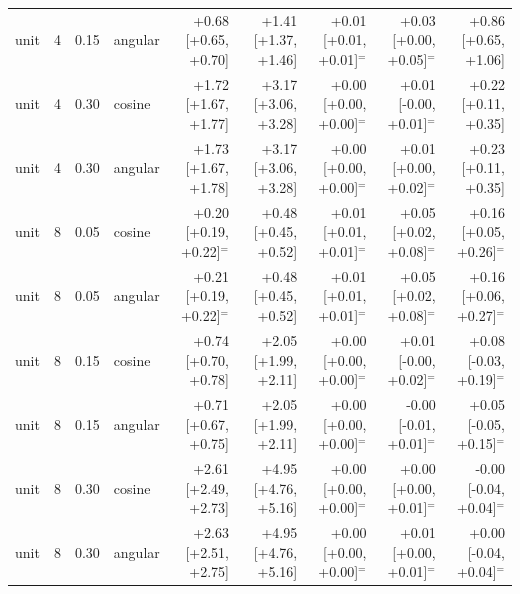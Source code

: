 \begin{tabular}{lrrlrrrrr}
unit & 4 & 0.15 & angular & +0.68 [+0.65, +0.70] & +1.41 [+1.37, +1.46] & +0.01 [+0.01, +0.01]$^{=}$ & +0.03 [+0.00, +0.05]$^{=}$ & +0.86 [+0.65, +1.06] \\
unit & 4 & 0.30 & cosine & +1.72 [+1.67, +1.77] & +3.17 [+3.06, +3.28] & +0.00 [+0.00, +0.00]$^{=}$ & +0.01 [-0.00, +0.01]$^{=}$ & +0.22 [+0.11, +0.35] \\
unit & 4 & 0.30 & angular & +1.73 [+1.67, +1.78] & +3.17 [+3.06, +3.28] & +0.00 [+0.00, +0.00]$^{=}$ & +0.01 [+0.00, +0.02]$^{=}$ & +0.23 [+0.11, +0.35] \\
unit & 8 & 0.05 & cosine & +0.20 [+0.19, +0.22]$^{=}$ & +0.48 [+0.45, +0.52] & +0.01 [+0.01, +0.01]$^{=}$ & +0.05 [+0.02, +0.08]$^{=}$ & +0.16 [+0.05, +0.26]$^{=}$ \\
unit & 8 & 0.05 & angular & +0.21 [+0.19, +0.22]$^{=}$ & +0.48 [+0.45, +0.52] & +0.01 [+0.01, +0.01]$^{=}$ & +0.05 [+0.02, +0.08]$^{=}$ & +0.16 [+0.06, +0.27]$^{=}$ \\
unit & 8 & 0.15 & cosine & +0.74 [+0.70, +0.78] & +2.05 [+1.99, +2.11] & +0.00 [+0.00, +0.00]$^{=}$ & +0.01 [-0.00, +0.02]$^{=}$ & +0.08 [-0.03, +0.19]$^{=}$ \\
unit & 8 & 0.15 & angular & +0.71 [+0.67, +0.75] & +2.05 [+1.99, +2.11] & +0.00 [+0.00, +0.00]$^{=}$ & -0.00 [-0.01, +0.01]$^{=}$ & +0.05 [-0.05, +0.15]$^{=}$ \\
unit & 8 & 0.30 & cosine & +2.61 [+2.49, +2.73] & +4.95 [+4.76, +5.16] & +0.00 [+0.00, +0.00]$^{=}$ & +0.00 [+0.00, +0.01]$^{=}$ & -0.00 [-0.04, +0.04]$^{=}$ \\
unit & 8 & 0.30 & angular & +2.63 [+2.51, +2.75] & +4.95 [+4.76, +5.16] & +0.00 [+0.00, +0.00]$^{=}$ & +0.01 [+0.00, +0.01]$^{=}$ & +0.00 [-0.04, +0.04]$^{=}$ \\
\bottomrule
\end{tabular}
